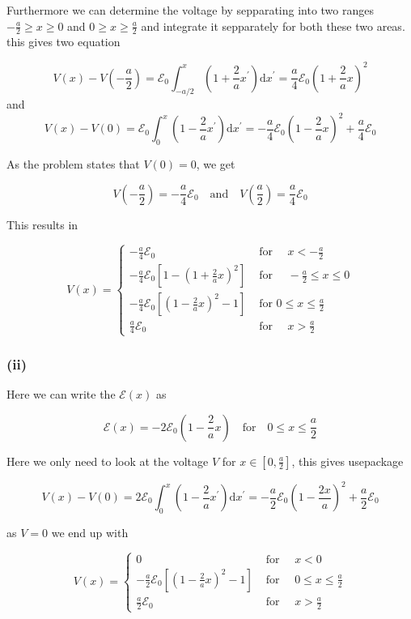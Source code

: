 Furthermore we can determine the voltage by sepparating into two ranges $-\frac{a}{2}\geq x \geq 0$ and $0\geq x \geq \frac{a}{2}$ and integrate it sepparately for both these two areas. this gives two equation

\[V(x)-V\left(-\frac{a}{2}\right)=\mathscr{E}_{0} \int_{-a / 2}^{x}\left(1+\frac{2}{a} x^{\prime}\right) \mathrm{d} x^{\prime}=\frac{a}{4} \mathscr{E}_{0}\left(1+\frac{2}{a} x\right)^{2}\]
and
\[V(x)-V(0)=\mathscr{E}_{0} \int_0^{x}\left(1-\frac{2}{a} x^{\prime}\right) \mathrm{d} x^{\prime}=-\frac{a}{4} \mathscr{E}_{0}\left(1-\frac{2}{a} x\right)^{2}+\frac{a}{4} \mathscr{E}_{0}\]

As the problem states that $V(0)=0$, we get

\[V\left(-\frac{a}{2}\right)=-\frac{a}{4} \mathscr{E}_{0} \quad  \text{and} \quad V\left(\frac{a}{2}\right)=\frac{a}{4} \mathscr{E}_{0}\]

This results in 

\[ V(x)=\left\{\begin{array}{ll}-\frac{a}{4} \mathscr{E}_{0} & \text { for } \quad x<-\frac{a}{2} \\ -\frac{a}{4} \mathscr{E}_{0}\left[1-\left(1+\frac{2}{a} x\right)^{2}\right] & \text { for } \quad-\frac{a}{2} \leq x \leq 0 \\ -\frac{a}{4} \mathscr{E}_{0}\left[\left(1-\frac{2}{a} x\right)^{2}-1\right] & \text { for } 0 \leq x \leq \frac{a}{2} \\ \frac{a}{4} \mathscr{E}_{0} & \text { for } \quad x>\frac{a}{2}\end{array}\right. \]
\subsubsection*{(ii)}
Here we can write the $\mathscr{E}(x)$ as

\[ \mathscr{E}(x)=-2 \mathscr{E}_{0}\left(1-\frac{2}{a} x\right) \quad \text{for} \quad 0 \leq x \leq \frac{a}{2} \]

Here we only need to look at the voltage $V$ for $x\in\left[0,\frac{a}{2}\right]$, this gives usepackage


\[ V(x)-V(0)=2 \mathscr{E}_{0} \int_{0}^{x}\left(1-\frac{2}{a} x^{\prime}\right) \mathrm{d} x^{\prime}=-\frac{a}{2} \mathscr{E}_{0}\left(1-\frac{2 x}{a}\right)^{2}+\frac{a}{2} \mathscr{E}_{0} \]

as $V=0$ we end up with 

\[ V(x)=\left\{\begin{array}{ll}0 & \text { for } \quad x<0 \\ -\frac{a}{2} \mathscr{E}_{0}\left[\left(1-\frac{2}{a} x\right)^{2}-1\right] & \text { for } \quad 0 \leq x \leq \frac{a}{2} \\ \frac{a}{2} \mathscr{E}_{0} & \text { for } \quad x>\frac{a}{2}\end{array}\right. \]

